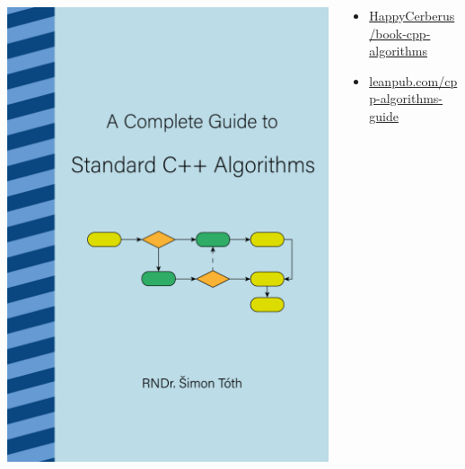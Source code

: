\documentclass[aspectratio=169]{beamer}
\begin{document}
\begin{frame}{}
    \begin{columns}
        \begin{column}{0.27\textwidth}
            \includegraphics[height=0.8\textheight]{static/book_cover.png}
        \end{column}
        \begin{column}{0.43\textwidth}
        \small
            \begin{itemize}
                \item \href{https://github.com/HappyCerberus/book-cpp-algorithms}{HappyCerberus/book-cpp-algorithms}
                \item \href{https://leanpub.com/cpp-algorithms-guide}{leanpub.com/cpp-algorithms-guide}
            \end{itemize}
            \begin{itemize}

\end{itemize}
\end{column}
\end{columns}
\end{frame}
\end{document}
